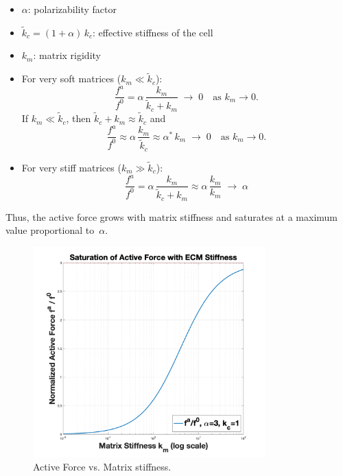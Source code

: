 \documentclass{article}
\begin{document}
\begin{itemize}
  \item $\displaystyle \alpha$: polarizability factor
  \item $\displaystyle \tilde{k}_{c} = (1 + \alpha)\,k_{c}$: effective stiffness of the cell
  \item $k_{m}$: matrix rigidity
\end{itemize}

\begin{itemize}
  \item For very soft matrices (\(k_{m}\ll \tilde{k}_{c}\)):
    \[
      \frac{f^{a}}{f^{0}}
      = \alpha \,\frac{k_{m}}{\tilde{k}_{c} + k_{m}}
      \;\longrightarrow\;0
      \quad\text{as }k_{m}\to 0.
    \]
    If \(k_{m}\ll \tilde{k}_{c}\), then \(\tilde{k}_{c}+k_{m}\approx \tilde{k}_{c}\) and
    \[
      \frac{f^{a}}{f^{0}}
      \approx \alpha \,\frac{k_{m}}{\tilde{k}_{c}}
       \approx   \alpha^{*}  \,k_{m}
      \;\longrightarrow\;0
      \quad\text{as }k_{m}\to 0.
    \]
  \item For very stiff matrices (\(k_{m}\gg \tilde{k}_{c}\)):
    \[
      \frac{f^{a}}{f^{0}}
      = \alpha \,\frac{k_{m}}{\tilde{k}_{c} + k_{m}}
      \approx \alpha \,\frac{k_{m}}{k_{m}} 
      \;\longrightarrow\;\alpha
    \] 
\end{itemize}

Thus, the active force grows with matrix stiffness and  
saturates at a maximum value proportional to~$\alpha$.

\begin{figure}[H]
  \centering
  \includegraphics[width=0.8\textwidth]{plot}
  \caption{Active Force vs. Matrix stiffness.}
  \label{fig:activeForcet}
\end{figure}
     


\end{document}
